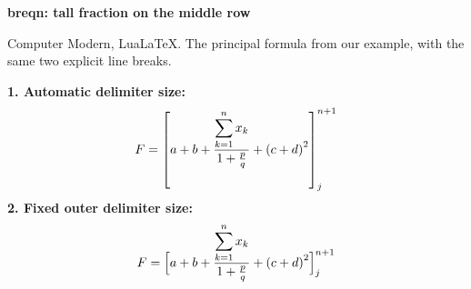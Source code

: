 \documentclass{article}
\begin{document}
\noindent\textbf{breqn: tall fraction on the middle row}
\par\medskip
\noindent Computer Modern, LuaLaTeX. The principal formula from our example,
with the same two explicit line breaks.
\par\bigskip
\noindent\textbf{1. Automatic delimiter size: \texttt{\string{}}}
\begin{dmath*}
 F=\left[a+b\\
 +\frac{\displaystyle\sum_{k=1}^n x_k}{1+\frac pq}\\
 +\left(c+d\right)^2\right]^{n+1}_j
\end{dmath*}
\bigskip
\noindent\textbf{2. Fixed outer delimiter size: \texttt{\string{}}}
\begin{dmath*}
 F=\Bigl[a+b\\
 +\frac{\displaystyle\sum_{k=1}^n x_k}{1+\frac pq}\\
 +\left(c+d\right)^2\Bigr]^{n+1}_j
\end{dmath*}
\end{document}
